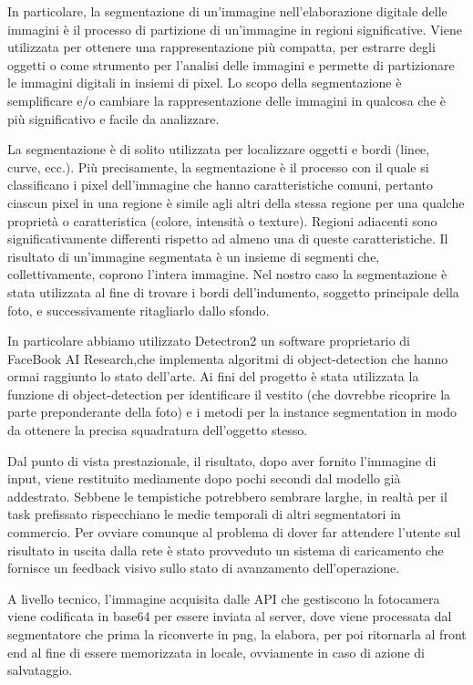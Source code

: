 In particolare, la segmentazione di un'immagine nell'elaborazione digitale delle immagini è il processo di partizione di un'immagine in regioni significative. Viene utilizzata per ottenere una rappresentazione più compatta, per estrarre degli oggetti o come strumento per l'analisi delle immagini e permette di partizionare le immagini digitali in insiemi di pixel. Lo scopo della segmentazione è semplificare e/o cambiare la rappresentazione delle immagini in qualcosa che è più significativo e facile da analizzare.

La segmentazione è di solito utilizzata per localizzare oggetti e bordi (linee, curve, ecc.). Più precisamente, la segmentazione è il processo con il quale si classificano i pixel dell'immagine che hanno caratteristiche comuni, pertanto ciascun pixel in una regione è simile agli altri della stessa regione per una qualche proprietà o caratteristica (colore, intensità o texture). Regioni adiacenti sono significativamente differenti rispetto ad almeno una di queste caratteristiche. Il risultato di un'immagine segmentata è un insieme di segmenti che, collettivamente, coprono l'intera immagine. Nel nostro caso la segmentazione è stata utilizzata al fine di trovare i bordi dell'indumento, soggetto principale della foto, e successivamente ritagliarlo dallo sfondo.

In particolare abbiamo utilizzato Detectron2 un software proprietario di FaceBook AI Research,che implementa algoritmi di object-detection che hanno ormai raggiunto lo stato dell'arte. Ai fini del progetto è stata utilizzata la funzione di object-detection per identificare il vestito (che dovrebbe ricoprire la parte preponderante della foto) e i metodi per la instance segmentation in modo da ottenere la precisa squadratura dell'oggetto stesso.

Dal punto di vista prestazionale, il risultato, dopo aver fornito l'immagine di input, viene restituito mediamente dopo pochi secondi dal modello già addestrato. Sebbene le tempistiche potrebbero sembrare larghe, in realtà per il task prefissato rispecchiano le medie temporali di altri segmentatori in commercio. Per ovviare comunque al problema di dover far attendere l'utente sul risultato in uscita dalla rete è stato provveduto un sistema di caricamento che fornisce un feedback visivo sullo stato di avanzamento dell'operazione.

A livello tecnico, l'immagine acquisita dalle API che gestiscono la fotocamera viene codificata in base64 per essere inviata al server, dove viene processata dal segmentatore che prima la riconverte in png, la elabora, per poi ritornarla al front end al fine di essere memorizzata in locale, ovviamente in caso di azione di salvataggio.

